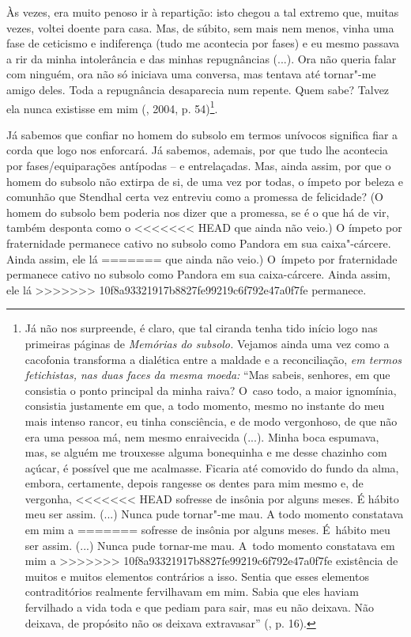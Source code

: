 {Às vezes, era muito penoso ir à repartição: isto chegou a tal extremo
que, muitas vezes, voltei doente para casa. Mas, de súbito, sem mais nem
menos, vinha uma fase de ceticismo e indiferença (tudo me acontecia por
fases) e eu mesmo passava a rir da minha intolerância e das minhas
repugnâncias (...). Ora não queria falar com ninguém, ora não só
iniciava uma conversa, mas tentava até tornar"-me amigo deles. Toda a
repugnância desaparecia num repente. Quem sabe? Talvez ela nunca
existisse em mim (, 2004, p. 54)\footnote{Já não nos
  surpreende, é claro, que tal ciranda tenha tido início logo nas
  primeiras páginas de \emph{Memórias do subsolo.} Vejamos ainda uma vez
  como a cacofonia transforma a dialética entre a maldade e a
  reconciliação, \emph{em termos fetichistas, nas duas faces da mesma
  moeda:} ``Mas sabeis, senhores, em que consistia o ponto principal da
  minha raiva? O~caso todo, a maior ignomínia, consistia justamente em
  que, a todo momento, mesmo no instante do meu mais intenso rancor, eu
  tinha consciência, e de modo vergonhoso, de que não era uma pessoa má,
  nem mesmo enraivecida (...). Minha boca espumava, mas, se alguém me
  trouxesse alguma bonequinha e me desse chazinho com açúcar, é possível
  que me acalmasse. Ficaria até comovido do fundo da alma, embora,
  certamente, depois rangesse os dentes para mim mesmo e, de vergonha,
<<<<<<< HEAD
  sofresse de insônia por alguns meses. É hábito meu ser assim. (...)
  Nunca pude tornar"-me mau. A todo momento constatava em mim a
=======
  sofresse de insônia por alguns meses. É~hábito meu ser assim. (...)
  Nunca pude tornar-me mau. A~todo momento constatava em mim a
>>>>>>> 10f8a93321917b8827fe99219c6f792e47a0f7fe
  existência de muitos e muitos elementos contrários a isso. Sentia que
  esses elementos contraditórios realmente fervilhavam em mim. Sabia que
  eles haviam fervilhado a vida toda e que pediam para sair, mas eu não
  deixava. Não deixava, de propósito não os deixava extravasar'' (,
  p. 16).}.

Já sabemos que confiar no homem do subsolo em termos unívocos significa
fiar a corda que logo nos enforcará. Já sabemos, ademais, por que tudo
lhe acontecia por fases/equiparações antípodas -- e entrelaçadas. Mas,
ainda assim, por que o homem do subsolo não extirpa de si, de uma vez
por todas, o ímpeto por beleza e comunhão que Stendhal certa vez
entreviu como a promessa de felicidade? (O homem do subsolo bem poderia
nos dizer que a promessa, se é o que há de vir, também desponta como o
<<<<<<< HEAD
que ainda não veio.) O ímpeto por fraternidade permanece cativo no
subsolo como Pandora em sua caixa"-cárcere. Ainda assim, ele lá
=======
que ainda não veio.) O~ímpeto por fraternidade permanece cativo no
subsolo como Pandora em sua caixa-cárcere. Ainda assim, ele lá
>>>>>>> 10f8a93321917b8827fe99219c6f792e47a0f7fe
permanece.

}
